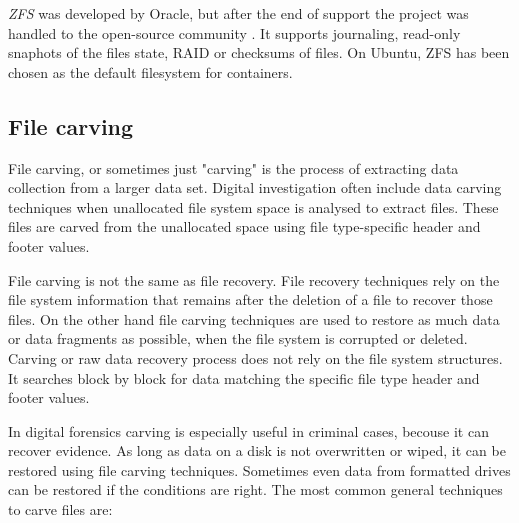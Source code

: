 \documentclass{acm_proc_article-sp}
\begin{document}
{\it ZFS} \cite{zfs} was developed by Oracle, but after the end of support the project was handled to the open-source community \cite{openzfs}. It supports journaling, read-only snaphots of the files state, RAID or checksums of files. On Ubuntu, ZFS has been chosen as the default filesystem for containers.

\subsection{File carving}

File carving, or sometimes just "carving" is the process of extracting data collection from a larger data set. Digital investigation often include data carving techniques when unallocated file system space is analysed to extract files. These files are carved from the unallocated space using file type-specific header and footer values\cite{merola2008data}.

File carving is not the same as file recovery. File recovery techniques rely on the file system information that remains after the deletion of a file to recover those files. On the other hand file carving techniques are used to restore as much data or data fragments as possible, when the file system is corrupted or deleted. Carving or raw data recovery process does not rely on the file system structures. It searches block by block for data matching the specific file type header and footer values\cite{beek2011introduction}. 

In digital forensics carving is especially useful in criminal cases, becouse it can recover evidence. As long as data on a disk is not overwritten or wiped, it can be restored using file carving techniques. Sometimes even data from formatted drives can be restored if the conditions are right. The most common general techniques to carve files are\cite{hadi2016reviewing}:
\end{document}

